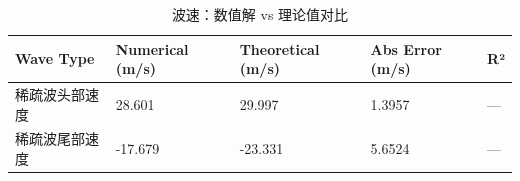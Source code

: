 \begin{table}
\caption{波速：数值解 vs 理论值对比}
\label{tab:waves}
\begin{tabular}{lllll}
\toprule
Wave Type & Numerical (m/s) & Theoretical (m/s) & Abs Error (m/s) & R² \\
\midrule
稀疏波头部速度 & 28.601 & 29.997 & 1.3957 & — \\
稀疏波尾部速度 & -17.679 & -23.331 & 5.6524 & — \\
\bottomrule
\end{tabular}
\end{table}

